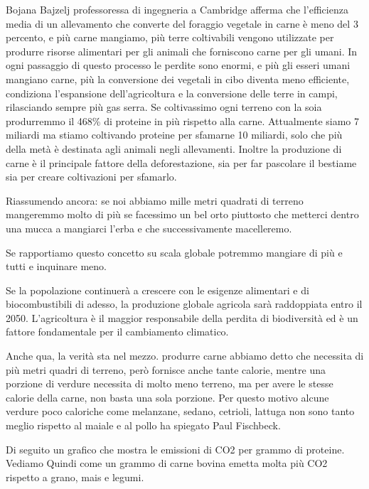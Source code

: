 \documentclass[12pt]{book} %
\begin{document}
Bojana Bajzelj professoressa di ingegneria a Cambridge afferma che l{}'efficienza media di un allevamento che converte
del foraggio vegetale in carne è meno del 3 percento, e più carne mangiamo, più terre coltivabili vengono utilizzate
per produrre risorse alimentari per gli animali che forniscono carne per gli umani. In ogni passaggio di questo
processo le perdite sono enormi, e più gli esseri umani mangiano carne, più la conversione dei vegetali in cibo diventa
meno efficiente, condiziona l'espansione dell'agricoltura e la conversione delle terre in campi, rilasciando sempre più
gas serra. Se coltivassimo ogni terreno con la soia produrremmo il 468\% di proteine in più rispetto alla carne.
Attualmente siamo 7 miliardi ma stiamo coltivando proteine per sfamarne 10 miliardi, solo che più della metà è
destinata agli animali negli allevamenti. Inoltre la produzione di carne è il principale
fattore della deforestazione, sia per far pascolare il bestiame sia per creare coltivazioni per sfamarlo.

\bigskip

Riassumendo ancora: se noi abbiamo mille metri quadrati di terreno mangeremmo molto di più se facessimo un bel orto
piuttosto che metterci dentro una mucca a mangiarci l'erba e che successivamente macelleremo.

Se rapportiamo questo concetto su scala globale potremmo mangiare di più e tutti e inquinare meno.

Se la popolazione continuerà a crescere con le esigenze alimentari e di biocombustibili di adesso, la produzione globale
agricola sarà raddoppiata entro il 2050. L'agricoltura è il maggior responsabile della perdita di biodiversità ed è un
fattore fondamentale per il cambiamento climatico.


\bigskip

Anche qua, la verità sta nel mezzo. produrre carne abbiamo detto che necessita di più metri quadri di terreno, però
fornisce anche tante calorie, mentre una porzione di verdure necessita di molto meno terreno, ma per avere le stesse
calorie della carne, non basta una sola porzione. Per questo motivo alcune verdure poco caloriche come melanzane,
sedano, cetrioli, lattuga non sono tanto meglio rispetto al maiale e al pollo ha spiegato Paul
Fischbeck.


\bigskip

Di seguito un grafico che mostra le emissioni di CO2 per grammo di proteine. Vediamo Quindi come un grammo di carne
bovina emetta molta più CO2 rispetto a grano, mais e legumi. 
\end{document}
